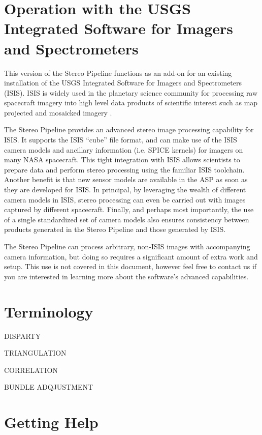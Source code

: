 \section{Operation with the USGS Integrated Software for Imagers and Spectrometers}

This version of the Stereo Pipeline functions as an add-on for an
existing installation of the USGS Integrated Software for Imagers and
Spectrometers (ISIS).  ISIS is widely used in the planetary science
community for processing raw spacecraft imagery into high level data
products of scientific interest such as map projected and mosaicked
imagery \cite{2004LPI....35.2039A, 1997LPI....28..387G, ISIS_website}.

The Stereo Pipeline provides an advanced stereo image processing
capability for ISIS.  It supports the ISIS ``cube'' file format, and
can make use of the ISIS camera models and ancillary information
(i.e. SPICE kernels) for imagers on many NASA spacecraft.  This tight
integration with ISIS allows scientists to prepare data and perform
stereo processing using the familiar ISIS toolchain.  Another benefit
is that new sensor models are available in the ASP as soon as they are
developed for ISIS.  In principal, by leveraging the wealth of
different camera models in ISIS, stereo processing can even be carried
out with images captured by different spacecraft.  Finally, and
perhaps most importantly, the use of a single standardized set of
camera models also ensures consistency between products generated in
the Stereo Pipeline and those generated by ISIS.

The Stereo Pipeline can process arbitrary, non-ISIS images with
accompanying camera information, but doing so requires a significant
amount of extra work and setup.  This use is not covered in this
document, however feel free to contact us if you are interested in
learning more about the software's advanced capabilities.

\section{Terminology}

DISPARTY

TRIANGULATION

CORRELATION

BUNDLE ADQJUSTMENT

\section{Getting Help}


